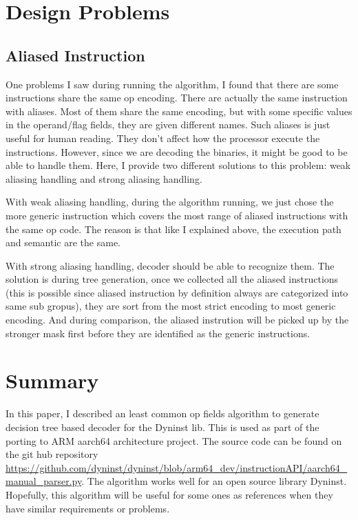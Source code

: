 \documentclass[]{article}
\begin{document}
\section{Design Problems}
\subsection{Aliased Instruction}
One problems I saw during running the algorithm, I found that there are some instructions share the same op encoding. There are actually the same instruction with aliases. Most of them share the same encoding, but with some specific values in the operand/flag fields, they are given different
names. Such aliases is just useful for human reading. They don't affect how the processor execute the instructions. However, since we are decoding 
the binaries, it might be good to be able to handle them. Here, I provide two different solutions to this problem: weak aliasing handling and strong aliasing handling.

With weak aliasing handling, during the algorithm running, we just chose the more generic instruction which covers the most range of aliased instructions with the same op code. The reason is that like I explained above, the execution path and semantic are the same.

With strong aliasing handling, decoder should be able to recognize them. The solution is during tree generation, once we collected all the aliased 
instructions (this is possible since aliased instruction by definition always are categorized into same sub gropus), they are sort from the most 
strict encoding to most generic encoding. And during comparison, the aliased instrution will be picked up by the stronger mask first before they are
identified as the generic instructions.

\section{Summary}
In this paper, I described an least common op fields algorithm to generate decision tree based decoder for the Dyninst lib. This is used as part of the porting to
ARM aarch64 architecture project. The source code can be found on the git hub repository \url{https://github.com/dyninst/dyninst/blob/arm64_dev/instructionAPI/aarch64_manual_parser.py}. The algorithm works well
for an open source library Dyninst. Hopefully, this algorithm will be useful for some ones as references when they have similar requirements or problems.

 

\end{document}
